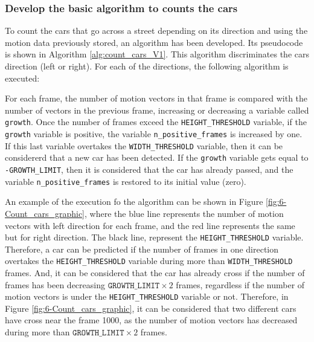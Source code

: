 \subsubsection{Develop the basic algorithm to counts the cars}
To count the cars that go across a street depending on its direction and using the motion data previously stored, an algorithm has been developed. Its pseudocode is shown in Algorithm \ref{alg:count_cars_V1}. This algorithm discriminates the cars direction (left or right). For each of the directions, the following algorithm is executed: 

For each frame, the number of motion vectors in that frame is compared with the number of vectors in the previous frame, increasing or decreasing a variable called \texttt{growth}. Once the number of frames exceed the \texttt{HEIGHT\_THRESHOLD} variable, if the \texttt{growth} variable is positive, the variable \texttt{n\_positive\_frames} is increased by one. If this last variable overtakes the \texttt{WIDTH\_THRESHOLD} variable, then it can be considererd that a new car has been detected. If the \texttt{growth} variable gets equal to \texttt{-GROWTH\_LIMIT}, then it is considered that the car has already passed, and the variable \texttt{n\_positive\_frames} is restored to its initial value (zero).

An example of the execution fo the algorithm can be shown in Figure \ref{fig:6-Count_cars_graphic}, where the blue line represents the number of motion vectors with left direction for each frame, and the red line represents the same but for right direction. The black line, represent the \texttt{HEIGHT\_THRESHOLD} variable. Therefore, a car can be predicted if the number of frames in one direction overtakes the \texttt{HEIGHT\_THRESHOLD} variable during more than \texttt{WIDTH\_THRESHOLD} frames. And, it can be considered that the car has already cross if the number of frames has been decreasing $\texttt{GROWTH\_LIMIT} \times 2 $ frames, regardless if the number of motion vectors is under the \texttt{HEIGHT\_THRESHOLD} variable or not. Therefore, in Figure \ref{fig:6-Count_cars_graphic}, it can be considered that two different cars have cross near the frame 1000, as the number of motion vectors has decreased during more than $\texttt{GROWTH\_LIMIT} \times 2 $ frames.

